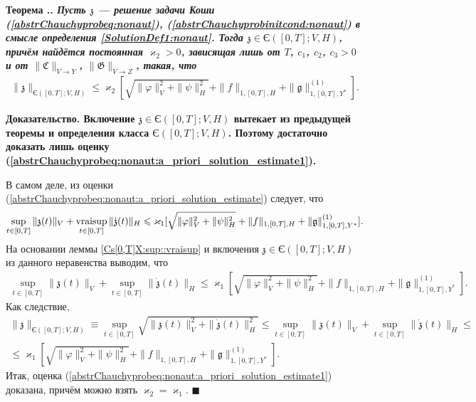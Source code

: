 \documentclass{report}
\newcounter{rem}[section]
\newcounter{theor}[section]
\renewcommand{\thetheor}{\thesection.\arabic{theor}}
\newenvironment{Theorem}{\par\refstepcounter{theor}\bf Теорема \thetheor. \it}{\rm\par}
\newenvironment{Proof}{\par\noindent\bf Доказательство.\rm}{ $\blacksquare$\par}
\newcommand{\vraisup}{\mathop{\rm vraisup}}
\begin{document}
\begin{Theorem}\label{unique_existence_theorem:nonaut..utochnenie}
Пусть $\mathfrak{z}$ --- решение задачи Коши (\ref{abstrChauchyprobeq:nonaut}), (\ref{abstrChauchyprobinitcond:nonaut}) в смысле определения \ref{SolutionDef1:nonaut}. Тогда $\mathfrak{z}\in\textrm{Є}([0,T];V,H)$, причём найдётся постоянная $\varkappa_2>0$, зависящая лишь от $T$, $c_1$, $c_2$, $c_3>0$ и от $\|\mathfrak{C}\|_{V\to Y}$,  $\|\mathfrak{G}\|_{V\to Z}$, такая, что
\begin{gather}\label{abstrChauchyprobeq:nonaut:a_priori_solution_estimate1}
\|\mathfrak{z}\|_{{\textrm{Є}}([0,T];V,H)}\leqslant \varkappa_2[\sqrt{\|\varphi\|^2_V+\|\psi\|_H^2}+ \|f\|_{1,[0,T],H}+\|\mathfrak{g}\|^{(1)}_{1,[0,T],Y^*}].
\end{gather}
\end{Theorem}
\begin{Proof}
Включение $\mathfrak{z}\in\textrm{Є}([0,T];V,H)$ вытекает из предыдущей теоремы и определения класса $\textrm{Є}([0,T];V,H)$. Поэтому достаточно
доказать лишь оценку (\ref{abstrChauchyprobeq:nonaut:a_priori_solution_estimate1}).

В самом деле, из оценки (\ref{abstrChauchyprobeq:nonaut:a_priori_solution_estimate}) следует, что
\begin{gather*}
\sup\limits_{t\in[0,T]}\|\mathfrak{z}(t)\|_V+\vraisup\limits_{t\in[0,T]}\|\dot{\mathfrak{z}}(t)\|_H\leqslant\varkappa_1[\sqrt{\|\varphi\|^2_V+\|\psi\|_H^2}+ \|f\|_{1,[0,T],H}+\|\mathfrak{g}\|^{(1)}_{1,[0,T],Y^*}].
\end{gather*}
На основании леммы \ref{Cs[0,T]X:sup::vraisup} и включения $\mathfrak{z}\in\textrm{Є}([0,T];V,H)$ из данного неравенства выводим, что
\begin{gather*}
\sup\limits_{t\in[0,T]}\|\mathfrak{z}(t)\|_V+\sup\limits_{t\in[0,T]}\|\dot{\mathfrak{z}}(t)\|_H\leqslant\varkappa_1[\sqrt{\|\varphi\|^2_V+\|\psi\|_H^2}+ \|f\|_{1,[0,T],H}+\|\mathfrak{g}\|^{(1)}_{1,[0,T],Y^*}].
\end{gather*}
Как следствие,
\begin{gather*}
\|\mathfrak{z}\|_{{\textrm{Є}}([0,T];V,H)}\equiv\sup\limits_{t\in[0,T]}\sqrt{\|\mathfrak{z}(t)\|_V^2+\|\dot{\mathfrak{z}}(t)\|_H^2}\leqslant\sup\limits_{t\in[0,T]}\|\mathfrak{z}(t)\|_V+\sup\limits_{t\in[0,T]}\|\dot{\mathfrak{z}}(t)\|_H\leqslant\\
\leqslant\varkappa_1[\sqrt{\|\varphi\|^2_V+\|\psi\|_H^2}+ \|f\|_{1,[0,T],H}+\|\mathfrak{g}\|^{(1)}_{1,[0,T],Y^*}].
\end{gather*}
Итак, оценка (\ref{abstrChauchyprobeq:nonaut:a_priori_solution_estimate1}) доказана, причём можно взять  $\varkappa_2=\varkappa_1$.
\end{Proof}
\end{document}
